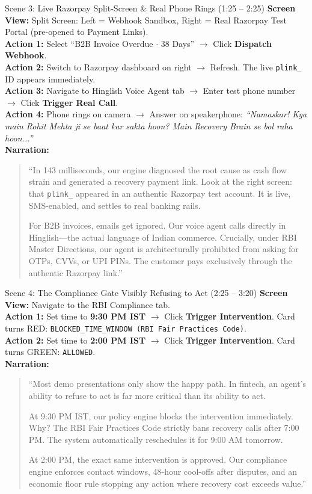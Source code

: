 \documentclass[11pt, a4paper]{article}
\begin{document}
\begin{scenebox}{Scene 3: Live Razorpay Split-Screen \& Real Phone Rings (1:25 -- 2:25)}
\textbf{Screen View:} Split Screen: Left = Webhook Sandbox, Right = Real Razorpay Test Portal (pre-opened to Payment Links).\\
\textbf{Action 1:} Select ``B2B Invoice Overdue $\cdot$ 38 Days'' $\rightarrow$ Click \textbf{Dispatch Webhook}.\\
\textbf{Action 2:} Switch to Razorpay dashboard on right $\rightarrow$ Refresh. The live \texttt{plink\_} ID appears immediately.\\
\textbf{Action 3:} Navigate to Hinglish Voice Agent tab $\rightarrow$ Enter test phone number $\rightarrow$ Click \textbf{Trigger Real Call}.\\
\textbf{Action 4:} Phone rings on camera $\rightarrow$ Answer on speakerphone:
\textit{``Namaskar! Kya main Rohit Mehta ji se baat kar sakta hoon? Main Recovery Brain se bol raha hoon...''}\\
\textbf{Narration:}
\begin{quote}
``In 143 milliseconds, our engine diagnosed the root cause as cash flow strain and generated a recovery payment link. Look at the right screen: that \texttt{plink\_} appeared in an authentic Razorpay test account. It is live, SMS-enabled, and settles to real banking rails.

For B2B invoices, emails get ignored. Our voice agent calls directly in Hinglish---the actual language of Indian commerce. Crucially, under RBI Master Directions, our agent is architecturally prohibited from asking for OTPs, CVVs, or UPI PINs. The customer pays exclusively through the authentic Razorpay link.''
\end{quote}
\end{scenebox}

\begin{scenebox}{Scene 4: The Compliance Gate Visibly Refusing to Act (2:25 -- 3:20)}
\textbf{Screen View:} Navigate to the RBI Compliance tab.\\
\textbf{Action 1:} Set time to \textbf{9:30 PM IST} $\rightarrow$ Click \textbf{Trigger Intervention}. Card turns RED: \texttt{BLOCKED\_TIME\_WINDOW (RBI Fair Practices Code)}.\\
\textbf{Action 2:} Set time to \textbf{2:00 PM IST} $\rightarrow$ Click \textbf{Trigger Intervention}. Card turns GREEN: \texttt{ALLOWED}.\\
\textbf{Narration:}
\begin{quote}
``Most demo presentations only show the happy path. In fintech, an agent's ability to refuse to act is far more critical than its ability to act.

At 9:30 PM IST, our policy engine blocks the intervention immediately. Why? The RBI Fair Practices Code strictly bans recovery calls after 7:00 PM. The system automatically reschedules it for 9:00 AM tomorrow.

At 2:00 PM, the exact same intervention is approved. Our compliance engine enforces contact windows, 48-hour cool-offs after disputes, and an economic floor rule stopping any action where recovery cost exceeds value.''
\end{quote}
\end{scenebox}
\end{document}

